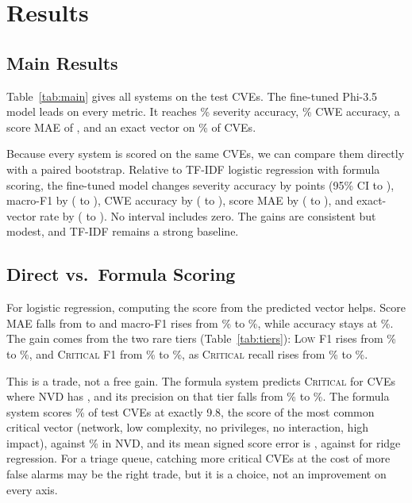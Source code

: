 \section{Results}\label{sec:results}



\subsection{Main Results}
Table~\ref{tab:main} gives all systems on the \nTest{} test CVEs.
The fine-tuned Phi-3.5 model leads on every metric.
It reaches \nLoRAfSev\% severity accuracy, \nLoRAfCwe\% CWE accuracy, a score MAE of \nLoRAfMae{}, and an exact vector on \nLoRAfVec\% of CVEs.

Because every system is scored on the same CVEs, we can compare them directly with a paired bootstrap.
Relative to TF-IDF logistic regression with formula scoring, the fine-tuned model changes severity accuracy by \nDiffLRfSev{} points (95\% CI \nDiffLRfSevLo{} to \nDiffLRfSevHi{}), macro-F1 by \nDiffLRfFone{} (\nDiffLRfFoneLo{} to \nDiffLRfFoneHi{}), CWE accuracy by \nDiffLRfCwe{} (\nDiffLRfCweLo{} to \nDiffLRfCweHi{}), score MAE by \nDiffLRfMae{} (\nDiffLRfMaeLo{} to \nDiffLRfMaeHi{}), and exact-vector rate by \nDiffLRfVec{} (\nDiffLRfVecLo{} to \nDiffLRfVecHi{}).
No interval includes zero.
The gains are consistent but modest, and TF-IDF remains a strong baseline.

\subsection{Direct vs.\ Formula Scoring}
For logistic regression, computing the score from the predicted vector helps.
Score MAE falls from \nLRdMae{} to \nLRfMae{} and macro-F1 rises from \nLRdFone\% to \nLRfFone\%, while accuracy stays at \nLRfSev\%.
The gain comes from the two rare tiers (Table~\ref{tab:tiers}): \textsc{Low} F1 rises from \nLRdFoneLow\% to \nLRfFoneLow\%, and \textsc{Critical} F1 from \nLRdFoneCritical\% to \nLRfFoneCritical\%, as \textsc{Critical} recall rises from \nLRdRecCritical\% to \nLRfRecCritical\%.

This is a trade, not a free gain.
The formula system predicts \textsc{Critical} for \nLRfCritPred{} CVEs where NVD has \nLRfCritTrue{}, and its precision on that tier falls from \nLRdCritPrec\% to \nLRfCritPrec\%.
The formula system scores \nLRfNineEight\% of test CVEs at exactly 9.8, the score of the most common critical vector (network, low complexity, no privileges, no interaction, high impact), against \nNvdNineEight\% in NVD, and its mean signed score error is \nLRfBias{}, against \nLRdBias{} for ridge regression.
For a triage queue, catching more critical CVEs at the cost of more false alarms may be the right trade, but it is a choice, not an improvement on every axis.

